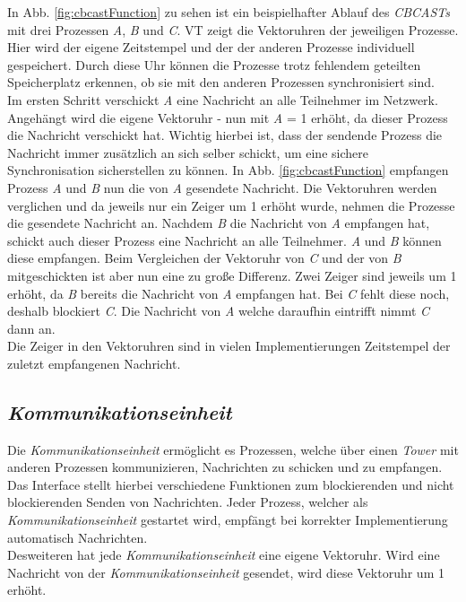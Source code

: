 In Abb. \ref{fig:cbcastFunction} zu sehen ist ein beispielhafter Ablauf des \textit{CBCASTs} mit drei Prozessen \textit{A}, \textit{B} und \textit{C}. VT zeigt die Vektoruhren der jeweiligen Prozesse. Hier wird der eigene Zeitstempel und der der anderen Prozesse individuell gespeichert. Durch diese Uhr können die Prozesse trotz fehlendem geteilten Speicherplatz erkennen, ob sie mit den anderen Prozessen synchronisiert sind.\\
Im ersten Schritt verschickt \textit{A} eine Nachricht an alle Teilnehmer im Netzwerk. Angehängt wird die eigene Vektoruhr - nun mit \textit{A} = 1 erhöht, da dieser Prozess die Nachricht verschickt hat. Wichtig hierbei ist, dass der sendende Prozess die Nachricht immer zusätzlich an sich selber schickt, um eine sichere Synchronisation sicherstellen zu können. In Abb. \ref{fig:cbcastFunction} empfangen Prozess \textit{A} und \textit{B} nun die von \textit{A} gesendete Nachricht. Die Vektoruhren werden verglichen und da jeweils nur ein Zeiger um 1 erhöht wurde, nehmen die Prozesse die gesendete Nachricht an. Nachdem \textit{B} die Nachricht von \textit{A} empfangen hat, schickt auch dieser Prozess eine Nachricht an alle Teilnehmer. \textit{A} und \textit{B} können diese empfangen. Beim Vergleichen der Vektoruhr von \textit{C} und der von \textit{B} mitgeschickten ist aber nun eine zu große Differenz. Zwei Zeiger sind jeweils um 1 erhöht, da \textit{B} bereits die Nachricht von \textit{A} empfangen hat. Bei \textit{C} fehlt diese noch, deshalb blockiert \textit{C}. Die Nachricht von \textit{A} welche daraufhin eintrifft nimmt \textit{C} dann an.\\
Die Zeiger in den Vektoruhren sind in vielen Implementierungen Zeitstempel der zuletzt empfangenen Nachricht.\\

\subsection{\textit{Kommunikationseinheit}}

Die \textit{\textit{Kommunikationseinheit}} ermöglicht es Prozessen, welche über einen \textit{Tower} mit anderen Prozessen kommunizieren, Nachrichten zu schicken und zu empfangen. Das Interface stellt hierbei verschiedene Funktionen zum blockierenden und nicht blockierenden Senden von Nachrichten. Jeder Prozess, welcher als \textit{Kommunikationseinheit} gestartet wird, empfängt bei korrekter Implementierung automatisch Nachrichten.\\
Desweiteren hat jede \textit{Kommunikationseinheit} eine eigene Vektoruhr. Wird eine Nachricht von der \textit{Kommunikationseinheit} gesendet, wird diese Vektoruhr um 1 erhöht.


